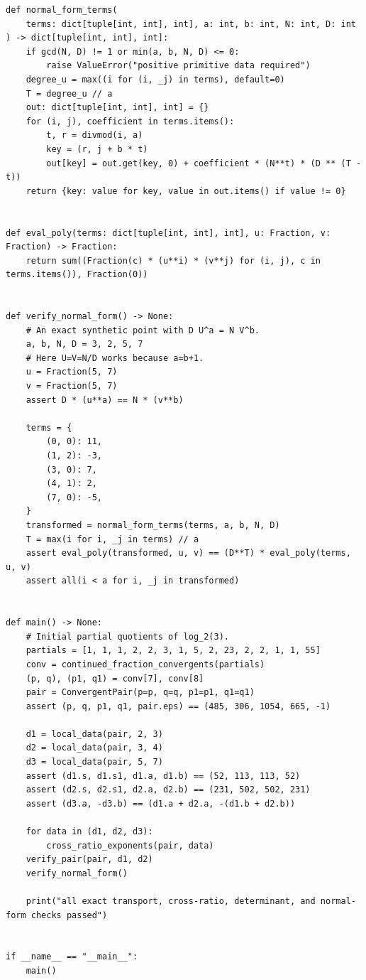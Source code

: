 \documentclass[11pt,oneside]{article}
\theoremstyle{definition}
\theoremstyle{remark}
\begin{document}
\begin{lstlisting}[style=pythonstyle,caption={Exact checks for transported local depths and tangent normal forms.}]
def normal_form_terms(
    terms: dict[tuple[int, int], int], a: int, b: int, N: int, D: int
) -> dict[tuple[int, int], int]:
    if gcd(N, D) != 1 or min(a, b, N, D) <= 0:
        raise ValueError("positive primitive data required")
    degree_u = max((i for (i, _j) in terms), default=0)
    T = degree_u // a
    out: dict[tuple[int, int], int] = {}
    for (i, j), coefficient in terms.items():
        t, r = divmod(i, a)
        key = (r, j + b * t)
        out[key] = out.get(key, 0) + coefficient * (N**t) * (D ** (T - t))
    return {key: value for key, value in out.items() if value != 0}


def eval_poly(terms: dict[tuple[int, int], int], u: Fraction, v: Fraction) -> Fraction:
    return sum((Fraction(c) * (u**i) * (v**j) for (i, j), c in terms.items()), Fraction(0))


def verify_normal_form() -> None:
    # An exact synthetic point with D U^a = N V^b.
    a, b, N, D = 3, 2, 5, 7
    # Here U=V=N/D works because a=b+1.
    u = Fraction(5, 7)
    v = Fraction(5, 7)
    assert D * (u**a) == N * (v**b)

    terms = {
        (0, 0): 11,
        (1, 2): -3,
        (3, 0): 7,
        (4, 1): 2,
        (7, 0): -5,
    }
    transformed = normal_form_terms(terms, a, b, N, D)
    T = max(i for i, _j in terms) // a
    assert eval_poly(transformed, u, v) == (D**T) * eval_poly(terms, u, v)
    assert all(i < a for i, _j in transformed)


def main() -> None:
    # Initial partial quotients of log_2(3).
    partials = [1, 1, 1, 2, 2, 3, 1, 5, 2, 23, 2, 2, 1, 1, 55]
    conv = continued_fraction_convergents(partials)
    (p, q), (p1, q1) = conv[7], conv[8]
    pair = ConvergentPair(p=p, q=q, p1=p1, q1=q1)
    assert (p, q, p1, q1, pair.eps) == (485, 306, 1054, 665, -1)

    d1 = local_data(pair, 2, 3)
    d2 = local_data(pair, 3, 4)
    d3 = local_data(pair, 5, 7)
    assert (d1.s, d1.s1, d1.a, d1.b) == (52, 113, 113, 52)
    assert (d2.s, d2.s1, d2.a, d2.b) == (231, 502, 502, 231)
    assert (d3.a, -d3.b) == (d1.a + d2.a, -(d1.b + d2.b))

    for data in (d1, d2, d3):
        cross_ratio_exponents(pair, data)
    verify_pair(pair, d1, d2)
    verify_normal_form()

    print("all exact transport, cross-ratio, determinant, and normal-form checks passed")


if __name__ == "__main__":
    main()
\end{lstlisting}
\end{document}
